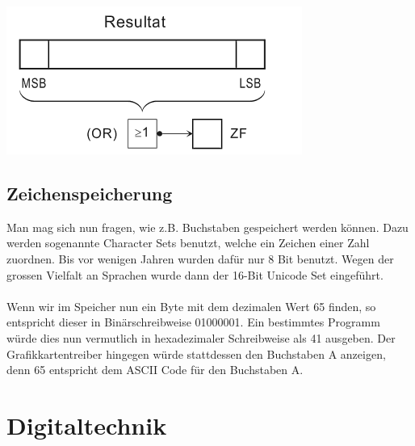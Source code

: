 \documentclass[a4paper,10pt]{report}
\begin{document}
\begin{center}
\includegraphics[scale=0.7]{imgs/Zeroflag.PNG}
\end{center}
\section{Zeichenspeicherung}
Man mag sich nun fragen, wie z.B. Buchstaben gespeichert werden können. Dazu werden sogenannte Character Sets benutzt, welche ein Zeichen einer Zahl zuordnen. Bis vor wenigen Jahren wurden dafür nur 8 Bit benutzt. Wegen der grossen Vielfalt an Sprachen wurde dann der 16-Bit Unicode Set eingeführt. \\ \\
Wenn wir im Speicher nun ein Byte mit dem dezimalen Wert 65 finden, so entspricht dieser in Binärschreibweise 01000001. Ein bestimmtes Programm würde dies nun vermutlich in hexadezimaler Schreibweise als 41 ausgeben. Der Grafikkartentreiber hingegen würde stattdessen den Buchstaben A anzeigen, denn 65 entspricht dem ASCII Code für den Buchstaben A.
\newpage\chapter{Digitaltechnik}
\end{document}
